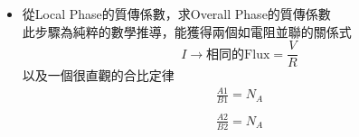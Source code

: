 \documentclass[../main.tex]{subfiles}
\begin{document}
\begin{itemize}
\begin{itemize}
\begin{align}
    \end{align}
    而$\frac{D_{AB}C_g}{L_g}$是氣相中Equimolar的質量傳輸係數$k'_y$\\
    將常數換掉後可寫成這樣:
    \begin{equation}
      N_A = k_y'\ln\left(
        \frac{1-y_{A,i}}{1-y_{A,g}}
      \right)
    \end{equation}
    定義Log Mean Concentration Difference:
    \begin{equation}
      \text{LM} = \frac{\mcirc{2}-\mcirc{1}}{\ln\left(\frac{\mcirc{2}}{\mcirc{1}}\right)} \label{eq:ch4_4_log_mean_concentration_difference}
    \end{equation}
    則可以將$N_A$換出LM:
    \begin{align}
       N_A &= k_y'\ln\left(
        \frac{1-y_{A,i}}{1-y_{A,g}}
      \right) \nonumber\\
      &= k_y' \cdot \frac{y_{A,g}-y_{A,i}}{\frac{y_{A,g}-y_{A,i}}{ \ln\left(
        \frac{1-y_{A,i}}{1-y_{A,g}}
      \right)}} \nonumber\\
      &= k_y' \cdot \frac{y_{A,g}-y_{A,i}}{
        \frac{(1-y_{A,i})-(1-y_{A,g})}{\ln\left(
          \frac{1-y_{A,i}}{1-y_{A,g}}
        \right)}} \nonumber\\
      &= k_y' \cdot \frac{y_{A,g}-y_{A,i}}{\left[1-y_A\right]_{i, LM}}
    \end{align}
    所以換句話說$k_y$會是$k_y'$的函數:
    \begin{equation}
      \boxed{k_y = \frac{k_y'}{\left[1-y_A\right]_{i, LM}},
      \quad N_A = k_y\left(y_{A,g}-y_{A,i}\right)}
    \end{equation}
    同理，在液相中:
    \begin{equation}
      \boxed{k_x = \frac{k_x'}{\left[1-x_A\right]_{i, LM}},
      \quad N_A = k_x\left(x_{A,i}-x_{A,l}\right)}
    \end{equation}
    \item 從Local Phase的質傳係數，求Overall Phase的質傳係數\\
    此步驟為純粹的數學推導，能獲得兩個如電阻並聯的關係式
    \begin{equation}
      I\to\text{相同的Flux} = \frac{V}{R}  
    \end{equation}
    以及一個很直觀的合比定律
    \begin{equation}
      \left.
      \begin{matrix}
        \frac{A1}{B1} = N_A \\
        \\
        \frac{A2}{B2} = N_A \\

\end{matrix}
\end{equation}
\end{itemize}
\end{itemize}
\end{document}
